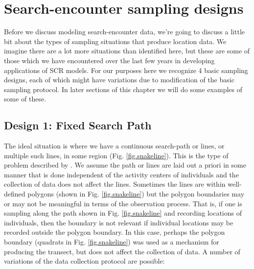 \section{Search-encounter sampling designs}

Before we discuss modeling search-encounter data, we're going to
discuss a little bit about the types of sampling situations that
produce location data.  We imagine there are a lot more situations
than identified here, but these are some of those which we have
encountered over the last few years in developing applications of SCR
models. 
For our purposes here we recognize 4 basic sampling designs, each of
which might have variations due to modification of the basic sampling
protocol. In later sections of this chapter we will do some examples
of some of these.

\subsection{Design 1: Fixed Search Path}

The ideal situation is where we have a continuous search-path or
lines, or multiple such lines, in some region
(Fig. \ref{fig.snakeline}). This is the type of problem described by
\citet{royle_etal:2011mee}. We assume the path or lines are laid out a
priori in some manner that is done independent of the activity centers
of individuals and the collection of data does not affect the
lines. Sometimes the lines are within well-defined polygons (shown in
Fig. \ref{fig.snakeline}) but the polygon boundaries may or may not be
meaningful in terms of the observation process. That is, if one is
sampling along the path shown in Fig. \ref{fig.snakeline} and
recording locations of individuals, then the boundary is not relevant
if individual locations may be recorded outside the polygon
boundary. In this case, perhaps the polygon boundary (quadrats in
Fig. \ref{fig.snakeline}) was used as a mechanism for producing the
transect, but does not affect the collection of data.  A number of
variations of the data collection protocol are possible:

